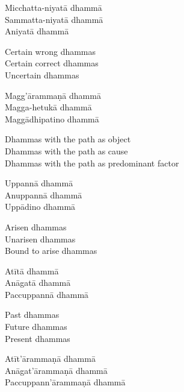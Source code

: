 \begin{pali-hang-continued}
Micchatta-niyatā dhammā\\
Sammatta-niyatā dhammā\\
Aniyatā dhammā
\end{pali-hang-continued}

\begin{english-verses}
  Certain wrong dhammas\\
  Certain correct dhammas\\
  Uncertain dhammas
\end{english-verses}

\begin{pali-hang-continued}
Magg'ārammaṇā dhammā\\
Magga-hetukā dhammā\\
Maggādhipatino dhammā
\end{pali-hang-continued}

\begin{english-verses}
  Dhammas with the path as object\\
  Dhammas with the path as cause\\
  Dhammas with the path as predominant factor
\end{english-verses}

\begin{pali-hang-continued}
Uppannā dhammā\\
Anuppannā dhammā\\
Uppādino dhammā
\end{pali-hang-continued}

\begin{english-verses}
  Arisen dhammas\\
  Unarisen dhammas\\
  Bound to arise dhammas
\end{english-verses}

\begin{pali-hang-continued}
Atītā dhammā\\
Anāgatā dhammā\\
Paccuppannā dhammā
\end{pali-hang-continued}

\begin{english-verses}
  Past dhammas\\
  Future dhammas\\
  Present dhammas
\end{english-verses}

\begin{pali-hang-continued}
Atīt'ārammaṇā dhammā\\
Anāgat'ārammaṇā dhammā\\
Paccuppann'ārammaṇā dhammā
\end{pali-hang-continued}

